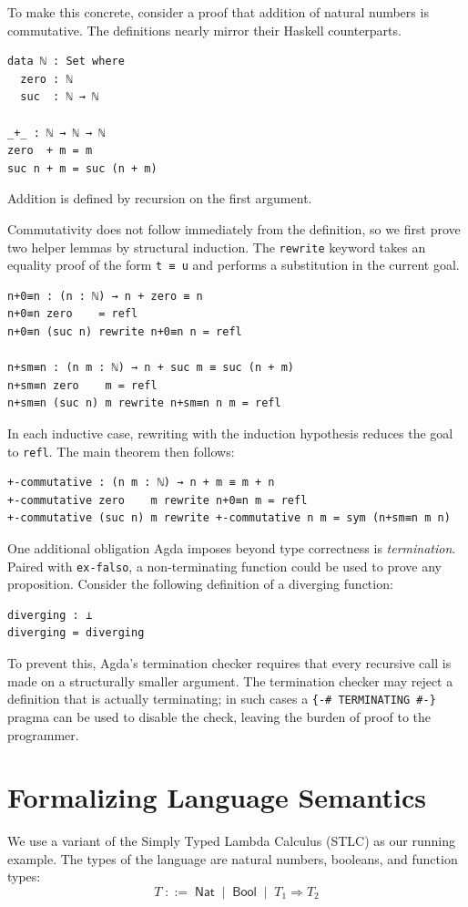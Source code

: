 To make this concrete, consider a proof that addition of natural numbers is commutative.
The definitions nearly mirror their Haskell counterparts.
\begin{verbatim}
data ℕ : Set where
  zero : ℕ
  suc  : ℕ → ℕ

_+_ : ℕ → ℕ → ℕ
zero  + m = m
suc n + m = suc (n + m)
\end{verbatim}
Addition is defined by recursion on the first argument.

Commutativity does not follow immediately from the definition, so we first prove two helper lemmas by structural induction.
The \texttt{rewrite} keyword takes an equality proof of the form \texttt{t ≡ u} and performs a substitution in the current goal.
\begin{verbatim}
n+0≡n : (n : ℕ) → n + zero ≡ n
n+0≡n zero    = refl
n+0≡n (suc n) rewrite n+0≡n n = refl

n+sm≡n : (n m : ℕ) → n + suc m ≡ suc (n + m)
n+sm≡n zero    m = refl
n+sm≡n (suc n) m rewrite n+sm≡n n m = refl
\end{verbatim}
In each inductive case, rewriting with the induction hypothesis reduces the goal to \texttt{refl}.
The main theorem then follows:
\begin{verbatim}
+-commutative : (n m : ℕ) → n + m ≡ m + n
+-commutative zero    m rewrite n+0≡n m = refl
+-commutative (suc n) m rewrite +-commutative n m = sym (n+sm≡n m n)
\end{verbatim}

One additional obligation Agda imposes beyond type correctness is \textit{termination}.
Paired with \texttt{ex-falso}, a non-terminating function could be used to prove any proposition. Consider the following definition of a diverging function:
\begin{verbatim}
diverging : ⊥
diverging = diverging
\end{verbatim}
To prevent this, Agda's termination checker requires that every recursive call is made on a structurally smaller argument.
The termination checker may reject a definition that is actually terminating; in such cases a \texttt{\{-\# TERMINATING \#-\}} pragma can be used to disable the check, leaving the burden of proof to the programmer.

\clearpage
\section{Formalizing Language Semantics}

We use a variant of the Simply Typed Lambda Calculus (STLC) as our running example.
The types of the language are natural numbers, booleans, and function types:
\[
  T \;::=\; \mathsf{Nat} \;\mid\; \mathsf{Bool} \;\mid\; T_1 \Rightarrow T_2
\]

